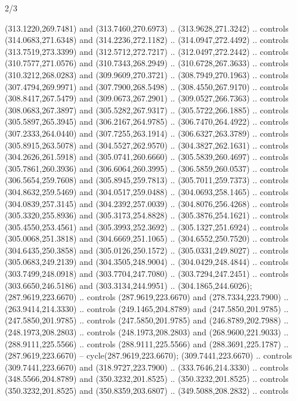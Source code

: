 \begin{flagdescription}{2/3}
\begin{scope}[xshift=0.5\flaglength,yshift=0.5\flagwidth,scale=\flagwidth/318.91]
\begin{scope}[y=0.8pt, x=0.8pt, yscale=-1,shift={(-298.97,-199.32)}]
  (313.1220,269.7481) and (313.7460,270.6973) .. (313.9628,271.3242) .. controls
  (314.0683,271.6348) and (314.2236,272.1182) .. (314.0947,272.4492) .. controls
  (313.7519,273.3399) and (312.5712,272.7217) .. (312.0497,272.2442) .. controls
  (310.7577,271.0576) and (310.7343,268.2949) .. (310.6728,267.3633) .. controls
  (310.3212,268.0283) and (309.9609,270.3721) .. (308.7949,270.1963) .. controls
  (307.4794,269.9971) and (307.7900,268.5498) .. (308.4550,267.9170) .. controls
  (308.8417,267.5479) and (309.0673,267.2901) .. (309.0527,266.7363) .. controls
  (308.0683,267.3897) and (305.5282,267.9317) .. (305.5722,266.1885) .. controls
  (305.5897,265.3945) and (306.2167,264.9785) .. (306.7470,264.4922) .. controls
  (307.2333,264.0440) and (307.7255,263.1914) .. (306.6327,263.3789) .. controls
  (305.8915,263.5078) and (304.5527,262.9570) .. (304.3827,262.1631) .. controls
  (304.2626,261.5918) and (305.0741,260.6660) .. (305.5839,260.4697) .. controls
  (305.7861,260.3936) and (306.6064,260.3995) .. (306.5859,260.0537) .. controls
  (306.5654,259.7608) and (305.8945,259.7813) .. (305.7011,259.7373) .. controls
  (304.8632,259.5469) and (304.0517,259.0488) .. (304.0693,258.1465) .. controls
  (304.0839,257.3145) and (304.2392,257.0039) .. (304.8076,256.4268) .. controls
  (305.3320,255.8936) and (305.3173,254.8828) .. (305.3876,254.1621) .. controls
  (305.4550,253.4561) and (305.3993,252.3692) .. (305.1327,251.6924) .. controls
  (305.0068,251.3818) and (304.6669,251.1065) .. (304.6552,250.7520) .. controls
  (304.6435,250.3858) and (305.0126,250.1572) .. (305.0331,249.8027) .. controls
  (305.0683,249.2139) and (304.3505,248.9004) .. (304.0429,248.4844) .. controls
  (303.7499,248.0918) and (303.7704,247.7080) .. (303.7294,247.2451) .. controls
  (303.6650,246.5186) and (303.3134,244.9951) .. (304.1865,244.6026);
 (287.9619,223.6670) .. controls
  (287.9619,223.6670) and (278.7334,223.7900) .. (263.9414,214.3330) .. controls
  (249.1465,204.8789) and (247.5850,201.9785) .. (247.5850,201.9785) .. controls
  (247.5850,201.9785) and (246.8789,202.7988) .. (248.1973,208.2803) .. controls
  (248.1973,208.2803) and (268.9600,221.9033) .. (288.9111,225.5566) .. controls
  (288.9111,225.5566) and (288.3691,225.1787) .. (287.9619,223.6670) --
  cycle(287.9619,223.6670);
 (309.7441,223.6670) .. controls
  (309.7441,223.6670) and (318.9727,223.7900) .. (333.7646,214.3330) .. controls
  (348.5566,204.8789) and (350.3232,201.8525) .. (350.3232,201.8525) .. controls
  (350.3232,201.8525) and (350.8359,203.6807) .. (349.5088,208.2832) .. controls

\end{scope}
\end{scope}
\end{flagdescription}
